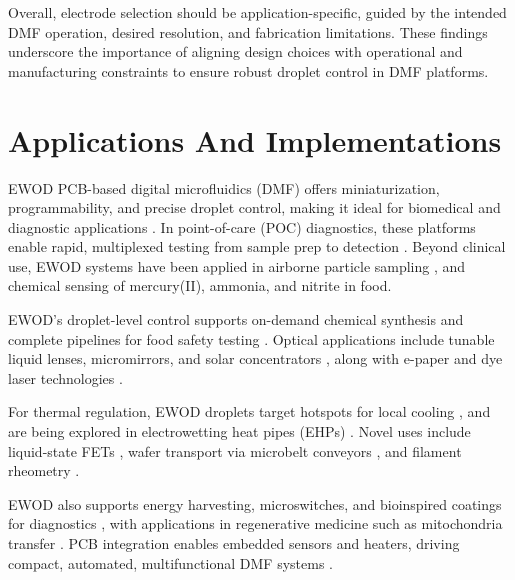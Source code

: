 \documentclass[conference,a4paper]{IEEEtran}
\begin{document}
Overall, electrode selection should be application-specific, guided by the intended DMF operation, desired resolution, and fabrication limitations. These findings underscore the importance of aligning design choices with operational and manufacturing constraints to ensure robust droplet control in DMF platforms.
\section{Applications And Implementations}
EWOD PCB-based digital microfluidics (DMF) offers miniaturization, programmability, and precise droplet control, making it ideal for biomedical and diagnostic applications \cite{howladarDesignAutomationTesting2020,dasPaperbasedMicrofluidicDevices2022}. In point-of-care (POC) diagnostics, these platforms enable rapid, multiplexed testing from sample prep to detection \cite{yafiaHighPrecisionControl2013}. Beyond clinical use, EWOD systems have been applied in airborne particle sampling \cite{chakrabartyFaulttolerantReconfigurableDigital2010,jebrailDigitalMicrofluidicsVersatile2012}, and chemical sensing of mercury(II), ammonia, and nitrite in food.

EWOD’s droplet-level control supports on-demand chemical synthesis \cite{chengRecentDesignApplication2025} and complete pipelines for food safety testing \cite{ullahDropletActuationEnhancement2024}. Optical applications include tunable liquid lenses, micromirrors, and solar concentrators \cite{samadDesignFabricationElectrode2015,wuResearchProgressElectrode2023}, along with e-paper and dye laser technologies \cite{garci-sanchezFundamentalsElectrowettingApplications2011,jebrailDigitalMicrofluidicsVersatile2012}.

For thermal regulation, EWOD droplets target hotspots for local cooling \cite{howellModelingSimulationDroplet2010}, and are being explored in electrowetting heat pipes (EHPs) \cite{haleElectrowettingbasedMicrofluidicOperations2017}. Novel uses include liquid-state FETs \cite{garci-sanchezFundamentalsElectrowettingApplications2011}, wafer transport via microbelt conveyors \cite{abdelgawadDigitalRevolutionNew2009}, and filament rheometry \cite{trolsLowcostViscositySensor2016}.

EWOD also supports energy harvesting, microswitches, and bioinspired coatings for diagnostics \cite{kanitthamniyomMagneticDigitalMicrofluidics2019}, with applications in regenerative medicine such as mitochondria transfer \cite{wuResearchProgressElectrode2023}. PCB integration enables embedded sensors and heaters, driving compact, automated, multifunctional DMF systems \cite{wuMicrofluidicPrintedCircuit2011}.
\end{document}

